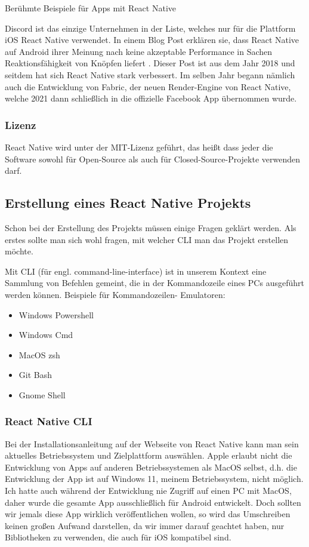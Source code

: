 \begin{center}
  Berühmte Beispiele für Apps mit React Native \cite{reactNativeShowcase}
\end{center}

Discord ist das einzige Unternehmen in der Liste, welches nur für die Plattform iOS React Native
verwendet. In einem Blog Post erklären sie, dass React Native auf Android ihrer Meinung nach keine
akzeptable Performance in Sachen Reaktionsfähigkeit von Knöpfen liefert \cite{reactNativeDiscord}.
Dieser Post ist aus dem Jahr 2018 und seitdem hat sich React Native stark verbessert. Im selben Jahr
begann nämlich auch die Entwicklung von Fabric, der neuen Render-Engine von React Native, welche
2021 dann schließlich in die offizielle Facebook App übernommen wurde.

\subsubsection{Lizenz}
React Native wird unter der MIT-Lizenz geführt, das heißt dass jeder die Software sowohl für
Open-Source als auch für Closed-Source-Projekte verwenden darf.

\subsection{Erstellung eines React Native Projekts}
Schon bei der Erstellung des Projekts müssen einige Fragen geklärt werden. Als erstes sollte man
sich wohl fragen, mit welcher CLI man das Projekt erstellen möchte.

Mit CLI (für engl. command-line-interface) ist in unserem Kontext eine Sammlung von Befehlen
gemeint, die in der Kommandozeile eines PCs ausgeführt werden können. Beispiele für Kommandozeilen-
Emulatoren:

\begin{itemize}
  \item Windows Powershell
  \item Windows Cmd
  \item MacOS zsh
  \item Git Bash
  \item Gnome Shell
\end{itemize}



\subsubsection{React Native CLI}
Bei der Installationsanleitung auf der Webseite von React Native kann man sein aktuelles
Betriebssystem und Zielplattform auswählen. Apple erlaubt nicht die Entwicklung von Apps auf anderen
Betriebssystemen als MacOS selbst, d.h. die Entwicklung der App ist auf Windows 11, meinem
Betriebssystem, nicht möglich. Ich hatte auch während der Entwicklung nie Zugriff auf einen PC mit
MacOS, daher wurde die gesamte App ausschließlich für Android entwickelt. Doch sollten wir jemals
diese App wirklich veröffentlichen wollen, so wird das Umschreiben keinen großen Aufwand darstellen,
da wir immer darauf geachtet haben, nur Bibliotheken zu verwenden, die auch für iOS kompatibel sind.

